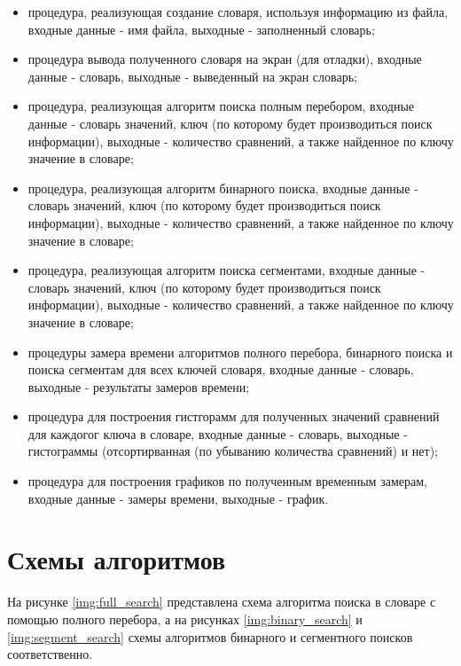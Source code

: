 \begin{itemize}
	\item процедура, реализующая создание словаря, используя информацию из файла, входные данные - имя файла, выходные - заполненный словарь;
	\item процедура вывода полученного словаря на экран (для отладки), входные данные - словарь, выходные - выведенный на экран словарь;
	\item процедура, реализующая алгоритм поиска полным перебором, входные данные - словарь значений, ключ (по которому будет производиться поиск информации), выходные - количество сравнений, а также найденное по ключу значение в словаре;
	\item процедура, реализующая алгоритм бинарного поиска, входные данные - словарь значений, ключ (по которому будет производиться поиск информации), выходные - количество сравнений, а также найденное по ключу значение в словаре;
	\item процедура, реализующая алгоритм поиска сегментами, входные данные - словарь значений, ключ (по которому будет производиться поиск информации), выходные - количество сравнений, а также найденное по ключу значение в словаре;
	\item процедуры замера времени алгоритмов полного перебора, бинарного поиска и поиска сегментам для всех ключей словаря, входные данные - словарь, выходные - результаты замеров времени;
	\item процедура для построения гистгорамм для полученных значений сравнений для каждогог ключа в словаре, входные данные - словарь, выходные - гистограммы (отсортирванная (по убыванию количества сравнений) и нет); 
	\item процедура для построения графиков по полученным временным замерам, входные данные - замеры времени, выходные - график. 
\end{itemize}


\section{Схемы алгоритмов}
На рисунке \ref{img:full_search} представлена схема алгоритма поиска в словаре с помощью полного перебора, а на рисунках \ref{img:binary_search} и \ref{img:segment_search} схемы алгоритмов бинарного и сегментного поисков соответственно.



